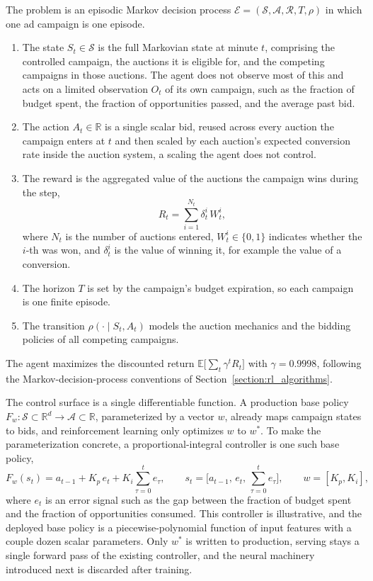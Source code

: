 The problem is an episodic Markov decision process $\mathcal{E}=(\mathcal{S},\mathcal{A},\mathcal{R},T,\rho)$ in which one ad campaign is one episode.
\begin{enumerate}
\item The state $S_t\in\mathcal{S}$ is the full Markovian state at minute $t$, comprising the controlled campaign, the auctions it is eligible for, and the competing campaigns in those auctions. The agent does not observe most of this and acts on a limited observation $O_t$ of its own campaign, such as the fraction of budget spent, the fraction of opportunities passed, and the average past bid.
\item The action $A_t\in\mathbb{R}$ is a single scalar bid, reused across every auction the campaign enters at $t$ and then scaled by each auction's expected conversion rate inside the auction system, a scaling the agent does not control.
\item The reward is the aggregated value of the auctions the campaign wins during the step,
\begin{equation}
R_t=\sum_{i=1}^{N_t}\delta_t^i\,W_t^i,
\end{equation}
where $N_t$ is the number of auctions entered, $W_t^i\in\{0,1\}$ indicates whether the $i$-th was won, and $\delta_t^i$ is the value of winning it, for example the value of a conversion.
\item The horizon $T$ is set by the campaign's budget expiration, so each campaign is one finite episode.
\item The transition $\rho(\cdot\mid S_t,A_t)$ models the auction mechanics and the bidding policies of all competing campaigns.
\end{enumerate}
The agent maximizes the discounted return $\mathbb{E}\big[\sum_t\gamma^t R_t\big]$ with $\gamma=0.9998$, following the Markov-decision-process conventions of Section~\ref{section:rl_algorithms}.

The control surface is a single differentiable function. A production base policy $F_w:\mathcal{S}\subset\mathbb{R}^d\to\mathcal{A}\subset\mathbb{R}$, parameterized by a vector $w$, already maps campaign states to bids, and reinforcement learning only optimizes $w$ to $w^*$. To make the parameterization concrete, a proportional-integral controller is one such base policy,
\begin{equation}
F_w(s_t)=a_{t-1}+K_p\,e_t+K_i\sum_{\tau=0}^{t}e_\tau,\qquad s_t=\big[a_{t-1},\,e_t,\,\textstyle\sum_{\tau=0}^{t}e_\tau\big],\qquad w=[K_p,K_i],
\end{equation}
where $e_t$ is an error signal such as the gap between the fraction of budget spent and the fraction of opportunities consumed. This controller is illustrative, and the deployed base policy is a piecewise-polynomial function of input features with a couple dozen scalar parameters. Only $w^*$ is written to production, serving stays a single forward pass of the existing controller, and the neural machinery introduced next is discarded after training.

